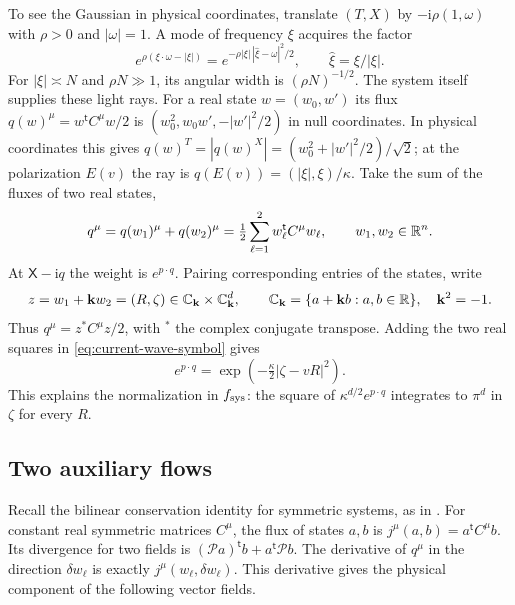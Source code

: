 To see the Gaussian in physical coordinates, translate $(T,X)$ by
$-\mathrm i\rho(1,\omega)$ with $\rho>0$ and $|\omega|=1$. A mode of
frequency $\xi$ acquires the factor
\[
 e^{\rho(\xi\cdot\omega-|\xi|)}
    =e^{-\rho|\xi|\,|\widehat\xi-\omega|^2/2},
       \qquad \widehat\xi=\xi/|\xi| .
\]
For $|\xi|\asymp N$ and $\rho N\gg1$, its angular width is
$(\rho N)^{-1/2}$. The system itself supplies these light rays.
For a real state $w=(w_0,w')$ its flux $q(w)^\mu=w^{\mathsf t}C^\mu w/2$
is $(w_0^2,w_0w',-|w'|^2/2)$ in null coordinates. In physical
coordinates this gives $q(w)^T=|q(w)^X|=(w_0^2+|w'|^2/2)/\sqrt2$;
at the polarization $E(v)$ the ray is $q(E(v))=(|\xi|,\xi)/\kappa$.
Take the sum of the fluxes of two real states,
\begin{equation}\label{eq:current-real-flux}
 q^\mu=q(w_1)^\mu+q(w_2)^\mu
   =\tfrac12\sum_{\ell=1}^2 w_\ell^{\mathsf t}C^\mu w_\ell,
    \qquad w_1,w_2\in\mathbb R^n .
\end{equation}
At $\mathsf X-\mathrm i q$ the weight is $e^{p\cdot q}$. Pairing
corresponding entries of the states, write
\[
 z=w_1+\mathbf k w_2=(R,\zeta)\in
 \mathbb C_{\mathbf k}\times\mathbb C_{\mathbf k}^{d},\qquad
 \mathbb C_{\mathbf k}=\{a+\mathbf k b:a,b\in\mathbb R\},\quad \mathbf k^2=-1 .
\]
Thus $q^\mu=z^*C^\mu z/2$, with $^*$ the complex conjugate transpose.
Adding the two real squares in \eqref{eq:current-wave-symbol} gives
\begin{equation}\label{eq:current-source-gaussian}
 e^{p\cdot q}=\exp\!\left(-\tfrac{\kappa}{2}|\zeta-vR|^2\right).
\end{equation}
This explains the normalization in $f_{\rm sys}$: the square of
$\kappa^{d/2}e^{p\cdot q}$ integrates to $\pi^d$ in $\zeta$ for every $R$.

\subsection{Two auxiliary flows}

Recall the bilinear conservation identity for symmetric systems,
as in \citet{Friedrichs1954}. For constant real symmetric matrices
$C^\mu$, the flux of states $a,b$ is $j^\mu(a,b)=a^{\mathsf t}C^\mu b$.
Its divergence for two fields is $(\mathscr P a)^{\mathsf t}b+
a^{\mathsf t}\mathscr P b$.
The derivative of $q^\mu$ in the direction $\delta w_\ell$ is exactly
$j^\mu(w_\ell,\delta w_\ell)$. This derivative gives the physical
component of the following vector fields.

